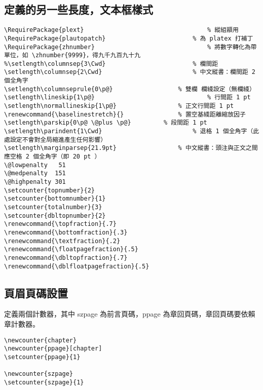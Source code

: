 \subsection{定義的另一些長度，文本框樣式}

\begin{lstlisting}[firstnumber=346]
\RequirePackage{plext}									% 縱組顓用
\RequirePackage{plautopatch}						% 為 platex 打補丁
\RequirePackage{zhnumber}								% 將數字轉化為帶單位，如 \zhnumber{9999}，得九千九百九十九
%\setlength\columnsep{3\Cwd}						% 欄間距
\setlength\columnsep{2\Cwd}							% 中文縱書：欄間距 2 個全角字
\setlength\columnseprule{0\p@}					% 雙欄 欄綫設定（無欄綫）
\setlength\lineskip{1\p@}								% 行間距 1 pt
\setlength\normallineskip{1\p@}					% 正文行間距 1 pt
\renewcommand{\baselinestretch}{}				% 置空基綫距離縮放因子
\setlength\parskip{0\p@ \@plus \p@}			% 段間距 1 pt
\setlength\parindent{1\Cwd}							% 退格 1 個全角字（此處設定不會對全局縮進產生任何影響）
\setlength\marginparsep{21.9pt}					% 中文縱書：頭注與正文之間應空格 2 個全角字（即 20 pt ）
\@lowpenalty   51
\@medpenalty  151
\@highpenalty 301
\setcounter{topnumber}{2}
\setcounter{bottomnumber}{1}
\setcounter{totalnumber}{3}
\setcounter{dbltopnumber}{2}
\renewcommand{\topfraction}{.7}
\renewcommand{\bottomfraction}{.3}
\renewcommand{\textfraction}{.2}
\renewcommand{\floatpagefraction}{.5}
\renewcommand{\dbltopfraction}{.7}
\renewcommand{\dblfloatpagefraction}{.5}
\end{lstlisting}

\subsection{頁眉頁碼設置 }

\par 定義兩個計數器，其中 szpage 為前言頁碼，ppage 為章回頁碼，章回頁碼要依賴章計數器。
\begin{lstlisting}[firstnumber=372]
\newcounter{chapter}
\newcounter{ppage}[chapter]
\setcounter{ppage}{1}

\newcounter{szpage}
\setcounter{szpage}{1}
\end{lstlisting}

